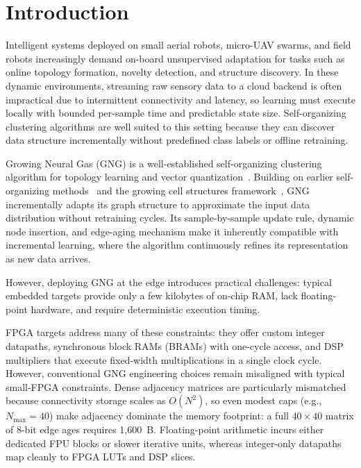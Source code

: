 \documentclass[conference]{IEEEtran}
\begin{document}
\section{Introduction}
Intelligent systems deployed on small aerial robots, micro-UAV swarms, and field robots increasingly demand on-board unsupervised adaptation for tasks such as online topology formation, novelty detection, and structure discovery. In these dynamic environments, streaming raw sensory data to a cloud backend is often impractical due to intermittent connectivity and latency, so learning must execute locally with bounded per-sample time and predictable state size. Self-organizing clustering algorithms are well suited to this setting because they can discover data structure incrementally without predefined class labels or offline retraining.

Growing Neural Gas (GNG) is a well-established self-organizing clustering algorithm for topology learning and vector quantization~\cite{fritzke1994growing}. Building on earlier self-organizing methods~\cite{kohonen1982self, Kohonen1995SOM} and the growing cell structures framework~\cite{Fritzke1994GCS}, GNG incrementally adapts its graph structure to approximate the input data distribution without retraining cycles. Its sample-by-sample update rule, dynamic node insertion, and edge-aging mechanism make it inherently compatible with incremental learning, where the algorithm continuously refines its representation as new data arrives.

However, deploying GNG at the edge introduces practical challenges: typical embedded targets provide only a few kilobytes of on-chip RAM, lack floating-point hardware, and require deterministic execution timing.

FPGA targets address many of these constraints: they offer custom integer datapaths, synchronous block RAMs (BRAMs) with one-cycle access, and DSP multipliers that execute fixed-width multiplications in a single clock cycle. However, conventional GNG engineering choices remain misaligned with typical small-FPGA constraints. Dense adjacency matrices are particularly mismatched because connectivity storage scales as $O(N^2)$, so even modest caps (e.g., $N_{\max}=40$) make adjacency dominate the memory footprint: a full $40\times 40$ matrix of 8-bit edge ages requires 1,600~B. Floating-point arithmetic incurs either dedicated FPU blocks or slower iterative units, whereas integer-only datapaths map cleanly to FPGA LUTs and DSP slices.
\end{document}
